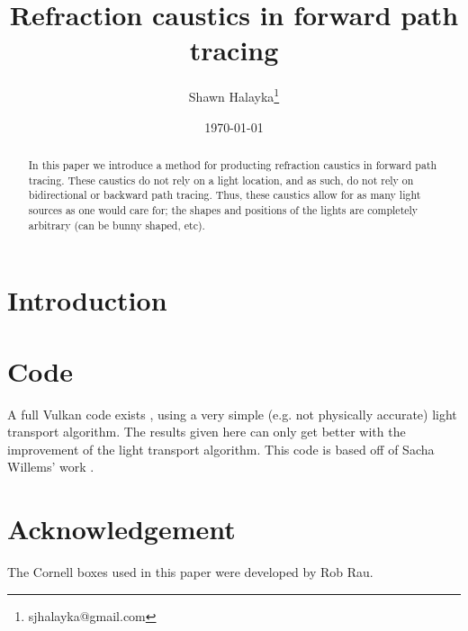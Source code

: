 \documentclass[12pt]{article}
\title{Refraction caustics in forward path tracing}
\author{
Shawn Halayka\footnote{sjhalayka@gmail.com}
}
\date{\today\;\currenttime}
\begin{document}
\newcommand{\abs}[1]{\lvert#1\rvert}



\maketitle




\begin{abstract}
In this paper we introduce a method for producting refraction caustics in forward path tracing.
These caustics do not rely on a light location, and as such, do not rely on bidirectional or backward path tracing.
Thus, these caustics allow for as many light sources as one would care for; the shapes and positions of the lights are completely arbitrary (can be bunny shaped, etc).
\end{abstract}

\section{Introduction}






\section{Code}
A full Vulkan code exists \cite{halayka}, using a very simple (e.g. not physically accurate) light transport algorithm.
The results given here can only get better with the improvement of the light transport algorithm.
This code is based off of Sacha Willems' work \cite{willems1, willems2}.



\section{Acknowledgement}

The Cornell boxes used in this paper were developed by Rob Rau.
\end{document}
